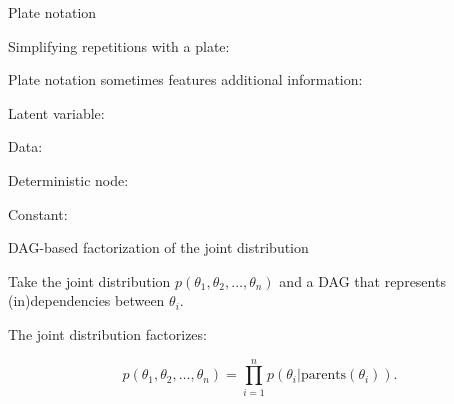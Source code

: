 \begin{frame}{Plate notation}

Simplifying repetitions with a plate:
\begin{center}
\end{center}

\smallskip

Plate notation sometimes features additional information:

\bigskip

\begin{scriptsize}

\begin{minipage}[c]{0.45\linewidth}
Latent variable:
\smallskip 
\begin{center}
\end{center}

Data:
\smallskip
\begin{center}
\end{center}
\end{minipage}
\begin{minipage}[c]{0.45\linewidth}
Deterministic node:
\smallskip 
\begin{center}
\end{center}
Constant:
\smallskip 
\begin{center}
\end{center}
\end{minipage}
\end{scriptsize}
\smallskip


\end{frame}


\begin{frame}{DAG-based factorization of the joint distribution}

Take the joint distribution $ p(\theta_1, \theta_2, \dots, \theta_n)$ and a DAG that represents (in)dependencies between $\theta_i$.

\bigskip

The joint distribution factorizes:

$$ p(\theta_1, \theta_2, \dots, \theta_n) = \prod_{i=1}^n p\left(\theta_i|\text{parents}(\theta_i)\right).$$

\end{frame}


